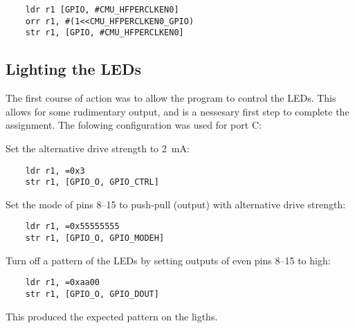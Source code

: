 \begin{verbatim}
    ldr r1 [GPIO, #CMU_HFPERCLKEN0]
    orr r1, #(1<<CMU_HFPERCLKEN0_GPIO)
    str r1, [GPIO, #CMU_HFPERCLKEN0]
\end{verbatim}


\subsection{Lighting the LEDs}
The first course of action was to allow the program to control the LEDs.
This allows for some rudimentary output, and is a nessesary first step to complete the assignment.
The folowing configuration was used for port C:

Set the alternative drive strength to \SI{2}{\milli\ampere}:
\begin{verbatim}
    ldr r1, =0x3
    str r1, [GPIO_O, GPIO_CTRL]
\end{verbatim}

Set the mode of pins 8--15 to push-pull (output) with alternative drive strength:
\begin{verbatim}
    ldr r1, =0x55555555
    str r1, [GPIO_O, GPIO_MODEH]
\end{verbatim}

Turn off a pattern of the LEDs by setting outputs of even pins 8--15 to high:
\begin{verbatim}
    ldr r1, =0xaa00
    str r1, [GPIO_O, GPIO_DOUT]
\end{verbatim}

This produced the expected pattern on the ligths.
